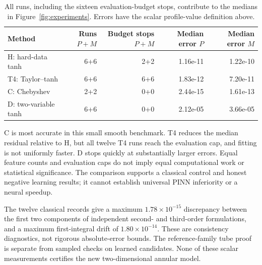 \documentclass[12pt,a4paper,oneside]{report}
\numberwithin{equation}{chapter}
\theoremstyle{remark}\newtheorem{remark}[theorem]{Remark}
\begin{document}
\begin{table}[htbp]\centering\small

\begin{tabular}{@{}lrrrr@{}}\toprule
Method & \shortstack{Runs\\$P+M$} & \shortstack{Budget stops\\$P+M$} & \shortstack{Median error\\$P$} & \shortstack{Median error\\$M$}\\\midrule
H: hard-data tanh & 6+6 & 2+2 & 1.16e-11 & 1.22e-10 \\
T4: Taylor--tanh & 6+6 & 6+6 & 1.83e-12 & 7.20e-11 \\
C: Chebyshev & 2+2 & 0+0 & 2.44e-15 & 1.61e-13 \\
D: two-variable tanh & 6+6 & 0+0 & 2.12e-05 & 3.66e-05 \\
\bottomrule\end{tabular}


\caption[Retained scalar runs and evaluation-budget stops]{All runs, including the sixteen evaluation-budget stops, contribute
to the medians in Figure~\ref{fig:experiments}. Errors have the scalar
profile-value definition above.}
\label{tab:experiment}
\end{table}

C is most accurate in this small smooth benchmark. T4 reduces the median
residual relative to H, but all twelve T4 runs reach the evaluation cap, and
fitting is not uniformly faster. D stops quickly at substantially larger
errors. Equal feature counts and evaluation caps do not imply equal
computational work or statistical significance. The comparison supports a
classical control and honest negative learning results; it cannot establish
universal PINN inferiority or a neural speedup.

The twelve classical records give a maximum $1.78\times10^{-15}$ discrepancy
between the first two components of independent second- and third-order
formulations, and a maximum first-integral drift of $1.80\times10^{-14}$.
These are consistency diagnostics, not rigorous absolute-error bounds.
The reference-family tube proof is separate from sampled checks on learned
candidates. None of these scalar measurements certifies the new two-dimensional
annular model.
\end{document}
